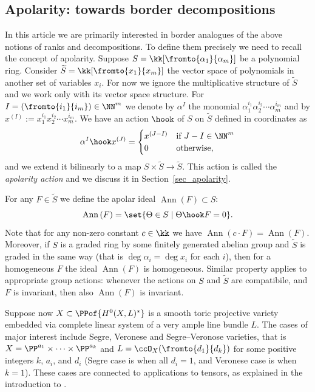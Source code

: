 \documentclass[12pt,a4paper]{article}
\newcommand{\apolar}[1][F]{\operatorname{Ann}\left(#1\right)}
\begin{document}
\subsection{Apolarity: towards border decompositions}
In this article we are primarily interested in border analogues of the above notions of ranks and decompositions.
To define them precisely we need to recall the concept of apolarity.
Suppose
$S=\kk[\fromto{\alpha_1}{\alpha_m}]$ be a polynomial ring.
Consider $\widetilde{S}=\kk[\fromto{x_1}{x_m}]$ the vector space of polynomials in another set of variables $x_i$.
For now we ignore the multiplicative structure of $\widetilde{S}$ and we work only with its vector space structure.
For $I= (\fromto{i_1}{i_m}) \in \NN^{m}$ we denote by $\alpha^I$ the monomial
$\alpha_1^{i_1}\alpha_2^{i_2}\dotsm\alpha_m^{i_m}$ and by $x^{(I)}:=x_1^{i_1} x_2^{i_2}\dotsm x_m^{i_m}$.
We have an action $\hook$ of $S$ on $\widetilde{S}$ defined in coordinates as
\[
 \alpha^I \hook x^{(J)} =
 \begin{cases}
    x^{(J-I)} &\text{if } J-I \in \NN^m\\
    0 &\text{otherwise,}
 \end{cases}
\]
and we  extend  it bilinearly to a map  $S\times \widetilde{S}\to \widetilde{S}$.
This action is called the \emph{apolarity action}  and we discuss it  in Section~\ref{sec_apolarity}.

For any $F\in \widetilde{S}$ we define the apolar ideal $\apolar \subset S$:
\[
 \apolar = \set{\Theta\in S \mid \Theta\hook F = 0}.
\]
Note that for any non-zero constant $c\in \kk$ we have $\apolar[c\cdot F] = \apolar$.
Moreover, if $S$ is a graded ring by some finitely generated abelian group and $\tilde{S}$ is graded in the same way (that is $\deg \alpha_i = \deg x_i$ for each $i$), then for a homogeneous $F$ the ideal $\apolar$ is homogeneous.
Similar property applies to appropriate group actions: whenever the actions on $S$ and $\tilde{S}$ are compatibile, and $F$ is invariant, then also $\apolar$ is invariant.


Suppose now $X\subset \PPof{H^0(X,L)^*}$ is a smooth toric projective variety embedded via complete linear system of a very ample line bundle $L$.
The cases of major interest include Segre, Veronese and Segre--Veronose varieties, that is $X=\PP^{a_1}\times\dotsb \times \PP^{a_k}$   and $L=\ccO_X (\fromto{d_1}{d_k})$ for some positive integers $k$, $a_i$, and $d_i$
(Segre case is when all $d_i=1$, and Veronese case is when $k=1$).
These cases are connected to applications to tensors, as explained in the introduction to \cite{nisiabu_jabu_border_apolarity}.
\end{document}
